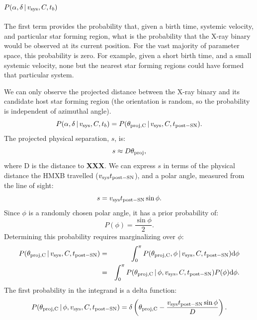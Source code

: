 \documentclass[12pt, preprint]{aastex}
\newcommand{\given}{\,|\,}
\newcommand{\dd}{\mathrm{d}}
\begin{document}
\subsection{$P(\alpha, \delta \given v_{\rm sys}, C, t_b)$}
The first term provides the probability that, given a birth time, systemic velocity, and particular star forming region, what is the probability that the X-ray binary would be observed at its current position. For the vast majority of parameter space, this probability is zero. For example, given a short birth time, and a small systemic velocity, none but the nearest star forming regions could have formed that particular system. 

We can only observe the projected distance between the X-ray binary and its candidate host star forming region (the orientation is random, so the probability is independent of azimuthal angle). 
\begin{equation}
P(\alpha, \delta \given v_{\rm sys}, C, t_b) = P(\theta_{\rm proj, C} \given v_{\rm sys}, C, t_{\rm post-SN}).
\end{equation}
The projected physical separation, $s$, is:
\begin{equation}
s \approx D \theta_{\rm proj},
\end{equation}
where D is the distance to {\bf XXX}. We can express $s$ in terms of the physical distance the HMXB travelled ($v_{\rm sys} t_{\rm post-SN}$), and a polar angle, measured from the line of sight:
\begin{equation}
s = v_{\rm sys} t_{\rm post-SN} \sin \phi.
\end{equation}
Since $\phi$ is a randomly chosen polar angle, it has a prior probability of:
\begin{equation}
P(\phi) = \frac{\sin \phi} {2}.
\end{equation}
Determining this probability requires marginalizing over $\phi$:
\begin{eqnarray}
P(\theta_{\rm proj, C} \given v_{\rm sys}, C, t_{\rm post-SN}) &=& \int_0^{\pi} P(\theta_{\rm proj, C}, \phi \given v_{\rm sys}, C, t_{\rm post-SN}) \dd \phi \\
&=& \int_0^{\pi} P(\theta_{\rm proj, C} \given \phi, v_{\rm sys}, C, t_{\rm post-SN}) P(\phi) \dd \phi. \label{eq:theta_proj_int}
\end{eqnarray}
The first probability in the integrand is a delta function:
\begin{equation}
P(\theta_{\rm proj, C} \given \phi, v_{\rm sys}, C, t_{\rm post-SN}) = \delta \left( \theta_{\rm proj, C} - \frac{v_{\rm sys} t_{\rm post-SN} \sin \phi}{D} \right).
\end{equation}
\end{document}
